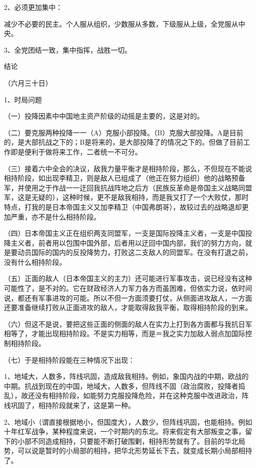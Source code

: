 2、必须更加集中：

减少不必要的民主。个人服从组织，少数服从多数，下级服从上级，全党服从中央。

3、全党团结一致，集中指挥，战胜一切。

结论

（六月三十日）

1、时局问题

（一）投降因素中中国地主资产阶级的动摇是主要的，这是对的。

（二）要克服两种投降一一（A）克服小部投降。（B）克服大部投降。A是目前的，是大部抗战之下的；B是将来的，是大部投降了的情况之下的。但做了目前工作即是便利于做将来工作，二者统一不可分。

（三）接着六中全会的决议，敌我力量平衡才是相持阶段，那么，不但现在不能说相持阶段，如出现李精卫，则是敌人已组成了（他正在努力组织）他的战略预备军，并使用之于作战一一迂回我抗战阵地之后方（民族反革命是帝国主义战略同盟军，这是无疑的），这种时候，更不是敌我相持，而是我又打了一个大败仗，那时特点，打我的是日本帝国主义又加李精卫（中国弗朗哥），故较过去的战略退却更加严重，亦不是什么相持阶段。

（四）日本帝国主义正在组织两支同盟军，一支是国际投降主义者，一支是中国投降主义者，前者用以包围中国外部，后者用以迂回中国内部，我们的努力方向，就是要动员国际的国内的反投降势力，打败这二支敌人的同盟军。在没有打退之前，没有什么相持阶段。

（五）正面的敌人（日本帝国主义的主力）还可能进行军事攻击，说已经没有这种可能性了，是不对的。它在财政经济人力军力各方而虽困难，但依实力说，依时间说，都还有军事进攻的可能。所以不但一方面须要打仗，从侧面进攻敌人，一方面还要准备继续打败从正面进攻的敌人，才能取得敌我平衡，取得相持阶段的到来。

（六）但这不是说，要把这些正面的侧面的敌人在实力上打到各方面都与我抗日军相等了，才能出现相持阶段。不是实力相等，而是＝我之实力加敌人弱点加国际控制相持阶段。

（七）于是相持阶段能在三种情况下出现：

1、地域大，人数多，阵线巩固，造成敌我相持。例如，象国内战的中期，欧战的中期。抗战到现在的中国，地域大，人数多，但阵线不固（政治腐败，投降者捣乱），故还没有相持阶段，如能努力克服投降危险，并在这种克服中改进政治，阵线巩固了，相持阶段就来了，这是第一种。

2、地域小（谓直接根据地小，但国度大），人数少，但阵线巩固，也能相持。例如十年红军战争，某种程度来说，一个时期内的东北。将来假定有大部叛变之事，留下的小部不同造成相持，只要能不断打破围剿，相持形势就有了。目前的华北局势，可以说是暂时的小局部的相持，把华北形势延长下去，就变成长期小局部相持了。

